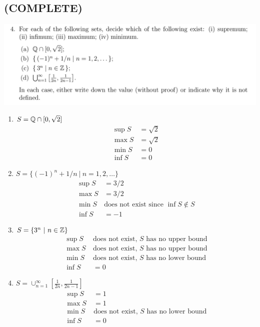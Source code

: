\documentclass[12pt]{article}
\begin{document}
\newpage
\subsection{(COMPLETE)}
\begin{mdframed}
  \includegraphics[width=400pt]{img/oxford-M2-analysis-I-2-4.png}
\end{mdframed}
\begin{enumerate}
\item $S = \mathbb{Q} \cap [0, \sqrt 2]$
  \begin{align*}
    \sup S &= \sqrt 2\\
    \max S &= \sqrt 2\\
    \min S &= 0\\
    \inf S &= 0
  \end{align*}
\item $S = \{(-1)^n + 1/n ~|~ n=1,2,\ldots\}$
  \begin{align*}
    \sup S &= 3/2\\
    \max S &= 3/2\\
    \min S ~&\text{does not exist since $\inf S \not\in S$}\\
    \inf S &= -1
  \end{align*}
\item $S = \{3^n ~|~ n \in \mathbb{Z}\}$
  \begin{align*}
    \sup S ~&\text{does not exist, $S$ has no upper bound}\\
    \max S ~&\text{does not exist, $S$ has no upper bound}\\
    \min S ~&\text{does not exist, $S$ has no lower bound}\\
    \inf S &= 0
  \end{align*}
\item $S = \cup_{n=1}^\infty [\frac{1}{2n}, \frac{1}{2n - 1}]$
  \begin{align*}
    \sup S ~&= 1\\
    \max S ~&= 1\\
    \min S ~&\text{does not exist, $S$ has no lower bound}\\
    \inf S ~&=0
  \end{align*}
\end{enumerate}
\end{document}
